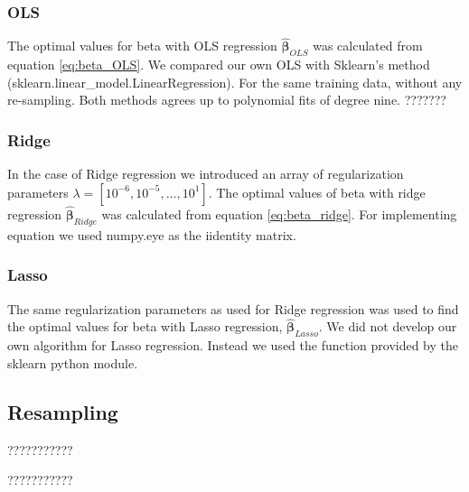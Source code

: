 \subsubsection{OLS}
The optimal values for beta with OLS regression $\hat{\bm{\beta}  }_{OLS}$ was
calculated from equation
\eqref{eq:beta_OLS}. We compared our own OLS with Sklearn's method
(sklearn.linear\_model.LinearRegression). For the same training data, without
any re-sampling. Both methods agrees up to polynomial fits of degree nine. ???????  



\subsubsection{Ridge}
In the case of Ridge regression we introduced an array of regularization
parameters $\lambda = [10^{-6}, 10^{-5}, \hdots, 10^{1}]$. The optimal values
of beta with ridge regression $\hat{\bm{\beta } } _{Ridge} $ was calculated
from equation \eqref{eq:beta_ridge}. For implementing equation we used numpy.eye as the iidentity matrix. 

\subsubsection{Lasso}
The same regularization parameters as used for Ridge regression was used to find the
optimal values for beta with Lasso regression, $\hat{\bm{\beta } } _{Lasso} $. We did not develop our
own algorithm for Lasso regression. Instead we used the function provided by the
sklearn python module.  

\subsection{Resampling}
???????????

???????????

